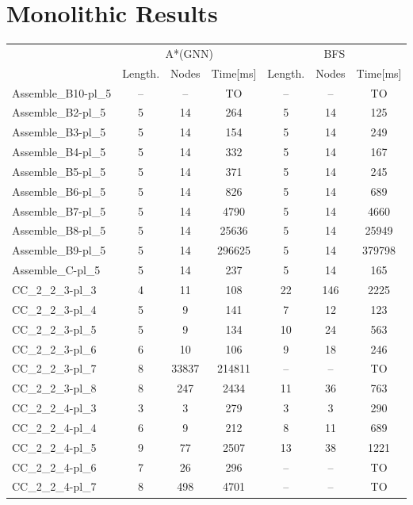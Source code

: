 \documentclass{article}
\newcommand{\BFSres}{BFS}
\newcommand{\GNNres}{A*(GNN)}
\newcommand{\planLength}{Length.}
\newcommand{\nodesExp}{Nodes}
\newcommand{\solvingTime}{Time}
\newcommand{\unsolvedColumn}{--}
\newcommand{\myTO}{TO}
\begin{document}
\section*{Monolithic Results}
\begin{longtable}[!ht]{l|ccc|ccc}
\centering
\multirow2{*}{\textbf{Instance Name}} & \multicolumn{3}{c|}{\GNNres} & \multicolumn{3}{c}{\BFSres} \\
\cline{2-7}
& \planLength & \nodesExp & \solvingTime [ms] & \planLength & \nodesExp & \solvingTime [ms] \\
\hline
Assemble\_B10-pl\_5 & \unsolvedColumn & \unsolvedColumn & \myTO & \unsolvedColumn & \unsolvedColumn & \myTO \\
Assemble\_B2-pl\_5 & 5 & 14 & 264 & 5 & 14 & 125 \\
Assemble\_B3-pl\_5 & 5 & 14 & 154 & 5 & 14 & 249 \\
Assemble\_B4-pl\_5 & 5 & 14 & 332 & 5 & 14 & 167 \\
Assemble\_B5-pl\_5 & 5 & 14 & 371 & 5 & 14 & 245 \\
Assemble\_B6-pl\_5 & 5 & 14 & 826 & 5 & 14 & 689 \\
Assemble\_B7-pl\_5 & 5 & 14 & 4790 & 5 & 14 & 4660 \\
Assemble\_B8-pl\_5 & 5 & 14 & 25636 & 5 & 14 & 25949 \\
Assemble\_B9-pl\_5 & 5 & 14 & 296625 & 5 & 14 & 379798 \\
Assemble\_C-pl\_5 & 5 & 14 & 237 & 5 & 14 & 165 \\
CC\_2\_2\_3-pl\_3 & 4 & 11 & 108 & 22 & 146 & 2225 \\
CC\_2\_2\_3-pl\_4 & 5 & 9 & 141 & 7 & 12 & 123 \\
CC\_2\_2\_3-pl\_5 & 5 & 9 & 134 & 10 & 24 & 563 \\
CC\_2\_2\_3-pl\_6 & 6 & 10 & 106 & 9 & 18 & 246 \\
CC\_2\_2\_3-pl\_7 & 8 & 33837 & 214811 & \unsolvedColumn & \unsolvedColumn & \myTO \\
CC\_2\_2\_3-pl\_8 & 8 & 247 & 2434 & 11 & 36 & 763 \\
CC\_2\_2\_4-pl\_3 & 3 & 3 & 279 & 3 & 3 & 290 \\
CC\_2\_2\_4-pl\_4 & 6 & 9 & 212 & 8 & 11 & 689 \\
CC\_2\_2\_4-pl\_5 & 9 & 77 & 2507 & 13 & 38 & 1221 \\
CC\_2\_2\_4-pl\_6 & 7 & 26 & 296 & \unsolvedColumn & \unsolvedColumn & \myTO \\
CC\_2\_2\_4-pl\_7 & 8 & 498 & 4701 & \unsolvedColumn & \unsolvedColumn & \myTO \\

\end{longtable}
\end{document}
